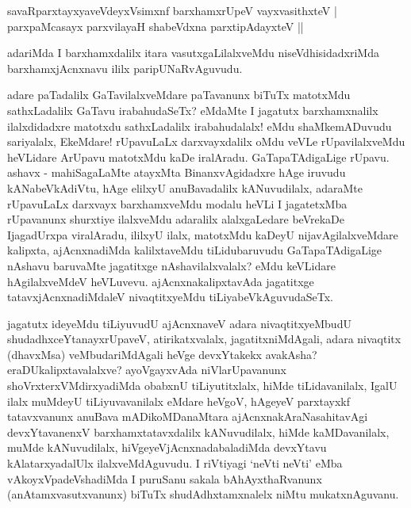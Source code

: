 \begin{shl}
savaRparxtayxyaveVdeyxV\s simxnf barxhamxrUpeV vayxvasithxteV |
parxpaMcasayx parxvilayaH shabeVdxna parxtipAdayxteV ||
\end{shl}

\begin{artha}
adariMda I barxhamxdalilx itara vasutxgaLilalxveMdu
niseVdhisidadxriMda barxhamxjAcnxnavu ililx paripUNaRvAguvudu. 

adare paTadalilx GaTavilalxveMdare paTavanunx biTuTx matotxMdu
sathxLadalilx GaTavu irabahudaSeTx? eMdaMte I jagatutx barxhamxnalilx
ilalxdidadxre matotxdu sathxLadalilx irabahudalalx! eMdu
shaMkemADuvudu sariyalalx, EkeMdare! rUpavuLaLx darxvayxdalilx oMdu
veVLe rUpavilalxveMdu heVLidare ArUpavu matotxMdu kaDe
iralAradu. GaTapaTAdigaLige rUpavu. ashavx - mahiSagaLaMte atayxMta
BinanxvAgidadxre hAge iruvudu kANabeVkAdiVtu, hAge elilxyU
anuBavadalilx kANuvudilalx, adaraMte rUpavuLaLx darxvayx barxhamxveMdu
modalu heVLi I jagatetxMba rUpavanunx shurxtiye ilalxveMdu adaralilx
alalxgaLedare beVrekaDe IjagadUrxpa viralAradu, ililxyU ilalx,
matotxMdu kaDeyU nijavAgilalxveMdare kalipxta, ajAcnxnadiMda
kalilxtaveMdu tiLidubaruvudu GaTapaTAdigaLige nAshavu baruvaMte
jagatitxge nAshavilalxvalalx? eMdu keVLidare hAgilalxveMdeV
heVLuvevu. ajAcnxnakalipxtavAda jagatitxge tatavxjAcnxnadiMdaleV
nivaqtitxyeMdu tiLiyabeVkAguvudaSeTx.
\end{artha}

\begin{artha}
jagatutx ideyeMdu tiLiyuvudU ajAcnxnaveV adara nivaqtitxyeMbudU
\break shudadhxceYtanayxrUpaveV, atirikatxvalalx, jagatitxniMdAgali, adara
nivaqtitx (dhavxMsa) veMbu\-dariMdAgali heVge devxYtakekx avakAsha?
eraDUkalipxtavalalxve? ayoVgayxvAda niVla\-rUpavanunx
shoVrxterxVMdirxyadiMda obabxnU tiLiyutitxlalx, hiMde
tiLidavanilalx, IgalU ilalx muMdeyU tiLiyuvavanilalx eMdare heVgoV,
hAgeyeV parxtayxkf tatavx\-vanunx anuBava mADikoMDanaMtara ajAcnxnakAraNasahitavAgi devxYtavanenxV barxhamxtatavxdalilx \-kANuvudilalx, hiMde
kaMDavanilalx, muMde kANuvudilalx, hiVgeyeVjAcnxnadabaladiMda
devxYtavu kAlatarxyadalUlx ilalxveMdAguvudu. I riVtiyagi `neVti neVti'
eMba vAkoyxVpadeVshadiMda I puruSanu sakala bAhAyxthaRvanunx
(anAtamxvasutxvanunx) biTuTx shudAdhxtamxnalelx niMtu mukatxnAguvanu.
\end{artha}

\begin{center}
\end{center}

